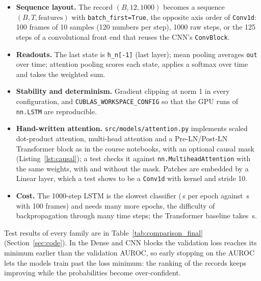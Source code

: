 \begin{itemize}[leftmargin=1.2em,itemsep=1pt]
  \item \textbf{Sequence layout.} The record $(B, 12, 1000)$ becomes a sequence $(B, T, \text{features})$
        with \texttt{batch\_first=True}, the opposite axis order of \texttt{Conv1d}: 100 frames of
        10 samples (120 numbers per step), 1000 raw steps, or the 125 steps of a convolutional front end
        that reuses the CNN's \texttt{ConvBlock}.
  \item \textbf{Readouts.} The last state is \texttt{h\_n[-1]} (last layer); mean pooling averages
        \texttt{out} over time; attention pooling scores each state, applies a softmax over time and
        takes the weighted sum.
  \item \textbf{Stability and determinism.} Gradient clipping at norm 1 in every configuration, and
        \texttt{CUBLAS\_WORKSPACE\_CONFIG} so that the GPU runs of \texttt{nn.LSTM} are reproducible.
  \item \textbf{Hand-written attention.} \texttt{src/models/attention.py} implements scaled dot-product
        attention, multi-head attention and a Pre-LN/Post-LN Transformer block as in the course
        notebooks, with an optional causal mask (Listing~\ref{lst:causal}); a test checks it against
        \texttt{nn.MultiheadAttention} with the same weights, with and without the mask. Patches are
        embedded by a Linear layer, which a test shows to be a \texttt{Conv1d} with kernel and stride 10.
  \item \textbf{Cost.} The 1000-step LSTM is the slowest classifier (\rnnEpochTimeMeanRaw{}\,s per
        epoch against \rnnEpochTimeMeanBase{}\,s with 100 frames) and needs many more epochs, the
        difficulty of backpropagation through many time steps; the Transformer baseline takes
        \transformerEpochTimeMeanBase{}\,s.
\end{itemize}



Test results of every family are in Table~\ref{tab:comparison_final} (Section~\ref{sec:code}).
In the Dense and CNN blocks the validation loss reaches its minimum earlier than the validation AUROC,
so early stopping on the AUROC lets the models train past the loss minimum: the ranking of the records
keeps improving while the probabilities become over-confident.

